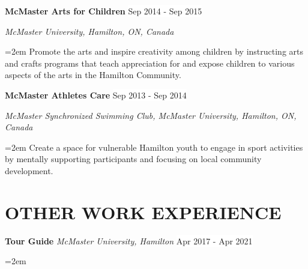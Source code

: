 \documentclass[paper=a4,fontsize=11pt]{scrartcl}	 			%
\newcommand{\NewPart}[1]{\section*{\uppercase{#1}}}
\newcommand{\EducationEntry}[4]{
		\noindent \textbf{#1} \hfill 					%
		\colorbox{White}{%
			\parbox{10em}{%
			\hfill\color{Black}#2}} \par				%
		\noindent \textit{#3} \par					%
		\noindent\hangindent=2em\hangafter=0 \small #4 	%
		\normalsize \par}
\newcommand{\WorkEntry}[4]{						%
		\noindent \textbf{#1} \hfill 					%
		\colorbox{White}{\color{Black}#2} \par		%
		\noindent \textit{#3} \par					%
		\noindent\hangindent=2em\hangafter=0 \small #4 	%
		\normalsize \par}
\newcommand{\WorkEntryE}[2]{						%
	\indent \indent \textbf{#1} \hfill 					%
	\colorbox{White}{\color{Black}#2} \par}
\newcommand{\WorkEntryH}[3]{						%
	\noindent \textbf{#1} \noindent \textit{#3} \hfill 					%
	\colorbox{White}{\color{Black}#2} 		%
	\par					%
	\noindent\hangindent=2em\hangafter=0 \small  	%
	\normalsize \par}
\begin{document}
\WorkEntry{McMaster Arts for Children}{Sep 2014 - Sep 2015}{McMaster University, Hamilton, ON, Canada}{Promote the arts and inspire creativity among children by instructing arts and crafts programs that teach appreciation for and expose children to various aspects of the arts in the Hamilton Community.}
\WorkEntry{McMaster Athletes Care}{Sep 2013 - Sep 2014}{McMaster Synchronized Swimming Club, McMaster University, Hamilton, ON, Canada}{Create a space for vulnerable Hamilton youth to engage in sport activities by mentally supporting participants and focusing on local community development.}

\NewPart{Other Work Experience}{}
\WorkEntryH{Tour Guide}{Apr 2017 - Apr 2021}{McMaster University, Hamilton}
%
%






\end{document}
